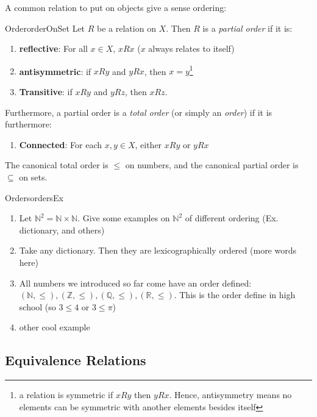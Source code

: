 \documentclass{book}
\newcommand{\N}{{\mathbb{N}}}
\newcommand{\Q}{{\mathbb{Q}}}
\newcommand{\R}{{\mathbb{R}}}
\newcommand{\Z}{{\mathbb{Z}}}
\newcommand{\sse}{\subseteq}
\begin{document}
A common relation to put on objects give a sense ordering:
\begin{defn}{Order}{orderOnSet}
	Let $R$ be a relation on $X$. Then $R$ is a \emph{partial order} if it is:
	\begin{enumerate}
		\item \textbf{reflective}: For all $x \in X$, $xRx$ ($x$ always relates to itself)
		\item \textbf{antisymmetric}: if $xRy$ and $yRx$, then $x=y$\footnote{a relation is symmetric if $xRy$
			then $yRx$. Hence, antisymmetry means no elements can be symmetric with another elements besides
		itself}
		\item \textbf{Transitive}: if $xRy$ and $yRz$, then $xRz$.
	\end{enumerate}
	Furthermore, a partial order is a \emph{total order} (or simply an \emph{order}) if it is furthermore:
	\begin{enumerate}
		\item[4.] \textbf{Connected}: For each $x,y \in X$, either $xRy$ or $yRx$
	\end{enumerate}
\end{defn}

The canonical total order is $\le$ on numbers, and the canonical partial order is $\sse$ on sets.

\begin{example}{Orders}{ordersEx}

	\begin{enumerate}
		\item Let $\N^2 = \N \times \N$. Give some examples on $\N^2$ of different ordering (Ex. dictionary, and others)
		\item Take any dictionary. Then they are lexicographically ordered (more words here)
		\item All numbers we introduced so far come have an order defined: $(\N, \le), (\Z, \le), (\Q, \le), (\R, \le)$.
			This is the order define in high school (so $3 \le 4$ or $3 \le \pi$)
		\item other cool example
	\end{enumerate}
\end{example}

\subsection*{Equivalence Relations}
\end{document}
